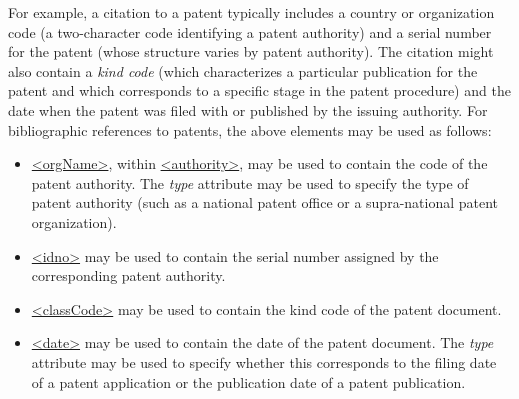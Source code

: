 \par
For example, a citation to a patent typically includes a country or organization code (a two-character code identifying a patent authority) and a serial number for the patent (whose structure varies by patent authority). The citation might also contain a \textit{kind code} (which characterizes a particular publication for the patent and which corresponds to a specific stage in the patent procedure) and the date when the patent was filed with or published by the issuing authority. For bibliographic references to patents, the above elements may be used as follows: \begin{itemize}
\item \hyperref[TEI.orgName]{<orgName>}, within \hyperref[TEI.authority]{<authority>}, may be used to contain the code of the patent authority. The {\itshape type} attribute may be used to specify the type of patent authority (such as a national patent office or a supra-national patent organization).
\item \hyperref[TEI.idno]{<idno>} may be used to contain the serial number assigned by the corresponding patent authority.
\item \hyperref[TEI.classCode]{<classCode>} may be used to contain the kind code of the patent document.
\item \hyperref[TEI.date]{<date>} may be used to contain the date of the patent document. The {\itshape type} attribute may be used to specify whether this corresponds to the filing date of a patent application or the publication date of a patent publication.
\end{itemize} \par
